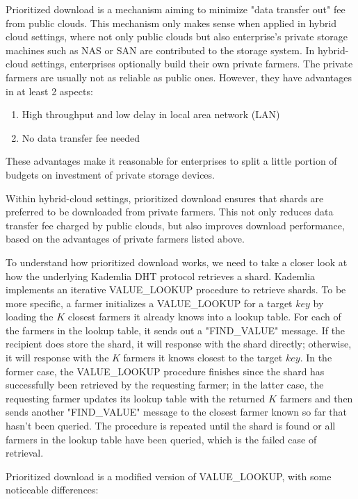 Prioritized download is a mechanism aiming to minimize "data transfer out" fee from public clouds. This mechanism only makes sense when applied in hybrid cloud settings, where not only public clouds but also enterprise's private storage machines such as NAS or SAN are contributed to the storage system. In hybrid-cloud settings, enterprises optionally build their own private farmers. The private farmers are usually not as reliable as public ones. However, they have advantages in at least 2 aspects:

\begin{enumerate}
  \item High throughput and low delay in local area network (LAN)
  \item No data transfer fee needed
\end{enumerate}

These advantages make it reasonable for enterprises to split a little portion of budgets on investment of private storage devices.

Within hybrid-cloud settings, prioritized download ensures that shards are preferred to be downloaded from private farmers. This not only reduces data transfer fee charged by public clouds, but also improves download performance, based on the advantages of private farmers listed above.

To understand how prioritized download works, we need to take a closer look at how the underlying Kademlia DHT protocol retrieves a shard. Kademlia implements an iterative VALUE\_LOOKUP procedure to retrieve shards. To be more specific, a farmer initializes a VALUE\_LOOKUP for a target $key$ by loading the $K$ closest farmers it already knows into a lookup table. For each of the farmers in the lookup table, it sends out a "FIND\_VALUE" message. If the recipient does store the shard, it will response with the shard directly; otherwise, it will response with the $K$ farmers it knows closest to the target $key$. In the former case, the VALUE\_LOOKUP procedure finishes since the shard has successfully been retrieved by the requesting farmer; in the latter case, the requesting farmer updates its lookup table with the returned $K$ farmers and then sends another "FIND\_VALUE" message to the closest farmer known so far that hasn't been queried. The procedure is repeated until the shard is found or all farmers in the lookup table have been queried, which is the failed case of retrieval.

\newpage

Prioritized download is a modified version of VALUE\_LOOKUP, with some noticeable differences:

